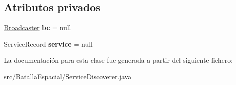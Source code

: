 \subsection*{Atributos privados}
\begin{DoxyCompactItemize}
\item 
\hypertarget{classBatallaEspacial_1_1ServiceDiscoverer_af0948e02c91640e35689341047e98479}{
\hyperlink{classBatallaEspacial_1_1Broadcaster}{Broadcaster} {\bfseries bc} = null}
\label{classBatallaEspacial_1_1ServiceDiscoverer_af0948e02c91640e35689341047e98479}

\item 
\hypertarget{classBatallaEspacial_1_1ServiceDiscoverer_a1474b91ea9c0f533076daa89764ee0d0}{
ServiceRecord {\bfseries service} = null}
\label{classBatallaEspacial_1_1ServiceDiscoverer_a1474b91ea9c0f533076daa89764ee0d0}

\end{DoxyCompactItemize}


La documentación para esta clase fue generada a partir del siguiente fichero:\begin{DoxyCompactItemize}
\item 
src/BatallaEspacial/ServiceDiscoverer.java\end{DoxyCompactItemize}
